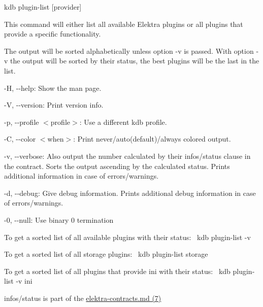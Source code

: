 {\ttfamily kdb plugin-\/list \mbox{[}provider\mbox{]}}

This command will either list all available Elektra plugins or all plugins that provide a specific functionality.

The output will be sorted alphabetically unless option {\ttfamily -\/v} is passed. With option {\ttfamily -\/v} the output will be sorted by their status, the best plugins will be the last in the list.


\begin{DoxyItemize}
\item {\ttfamily -\/H}, {\ttfamily -\/-\/help}\+: Show the man page.
\item {\ttfamily -\/V}, {\ttfamily -\/-\/version}\+: Print version info.
\item {\ttfamily -\/p}, {\ttfamily -\/-\/profile $<$profile$>$}\+: Use a different kdb profile.
\item {\ttfamily -\/C}, {\ttfamily -\/-\/color $<$when$>$}\+: Print never/auto(default)/always colored output.
\item {\ttfamily -\/v}, {\ttfamily -\/-\/verbose}\+: Also output the number calculated by their {\ttfamily infos/status} clause in the contract. Sorts the output ascending by the calculated status. Prints additional information in case of errors/warnings.
\item {\ttfamily -\/d}, {\ttfamily -\/-\/debug}\+: Give debug information. Prints additional debug information in case of errors/warnings.
\item {\ttfamily -\/0}, {\ttfamily -\/-\/null}\+: Use binary 0 termination
\end{DoxyItemize}

To get a sorted list of all available plugins with their status\+:~\newline
 {\ttfamily kdb plugin-\/list -\/v}

To get a sorted list of all storage plugins\+:~\newline
 {\ttfamily kdb plugin-\/list storage}

To get a sorted list of all plugins that provide {\ttfamily ini} with their status\+:~\newline
 {\ttfamily kdb plugin-\/list -\/v ini}


\begin{DoxyItemize}
\item {\ttfamily infos/status} is part of the \hyperlink{doc_help_elektra-contracts_md}{elektra-\/contracts.md (7)} 
\end{DoxyItemize}